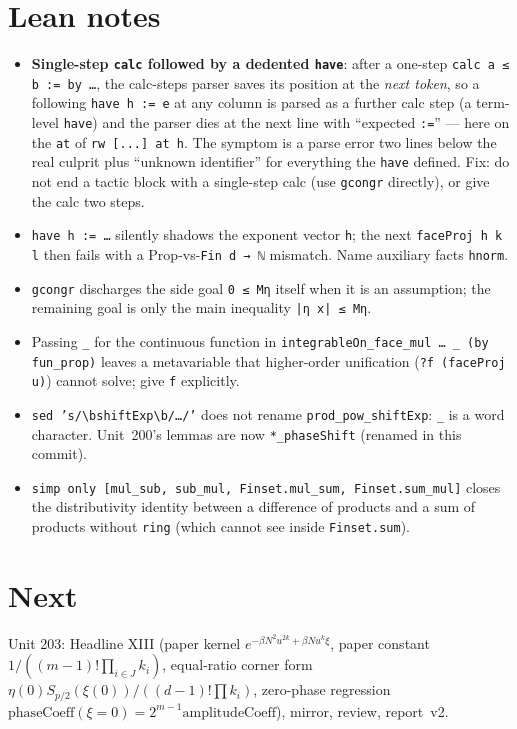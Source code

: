 \documentclass[11pt]{article}
\begin{document}
\section{Lean notes}
\begin{itemize}
\item \textbf{Single-step \texttt{calc} followed by a dedented \texttt{have}}: after a one-step
  \texttt{calc a ≤ b := by …}, the calc-steps parser saves its position at the \emph{next token},
  so a following \texttt{have h := e} at any column is parsed as a further calc step (a term-level
  \texttt{have}) and the parser dies at the next line with ``expected \texttt{:=}'' — here on the
  \texttt{at} of \texttt{rw [...] at h}. The symptom is a parse error two lines below the real
  culprit plus ``unknown identifier'' for everything the \texttt{have} defined. Fix: do not end a
  tactic block with a single-step calc (use \texttt{gcongr} directly), or give the calc two steps.
\item \texttt{have h := …} silently shadows the exponent vector \texttt{h}; the next
  \texttt{faceProj h k l} then fails with a Prop-vs-\texttt{Fin d → ℕ} mismatch. Name auxiliary
  facts \texttt{hnorm}.
\item \texttt{gcongr} discharges the side goal \texttt{0 ≤ Mη} itself when it is an assumption;
  the remaining goal is only the main inequality \texttt{|η x| ≤ Mη}.
\item Passing \texttt{\_} for the continuous function in
  \texttt{integrableOn\_face\_mul … \_ (by fun\_prop)} leaves a metavariable that
  higher-order unification (\texttt{?f (faceProj u)}) cannot solve; give \texttt{f} explicitly.
\item \texttt{sed 's/\textbackslash bshiftExp\textbackslash b/…/'} does not rename
  \texttt{prod\_pow\_shiftExp}: \texttt{\_} is a word character. Unit~200's lemmas are now
  \texttt{*\_phaseShift} (renamed in this commit).
\item \texttt{simp only [mul\_sub, sub\_mul, Finset.mul\_sum, Finset.sum\_mul]} closes the
  distributivity identity between a difference of products and a sum of products without
  \texttt{ring} (which cannot see inside \texttt{Finset.sum}).
\end{itemize}

\section{Next}
Unit 203: Headline XIII (paper kernel $e^{-\beta N^2u^{2k}+\beta Nu^k\xi}$, paper constant
$1/((m-1)!\prod_{i\in J}k_i)$, equal-ratio corner form $\eta(0)S_{p/2}(\xi(0))/((d-1)!\prod k_i)$,
zero-phase regression $\mathrm{phaseCoeff}(\xi=0)=2^{m-1}\mathrm{amplitudeCoeff}$), mirror,
review, report~v2.
\end{document}
